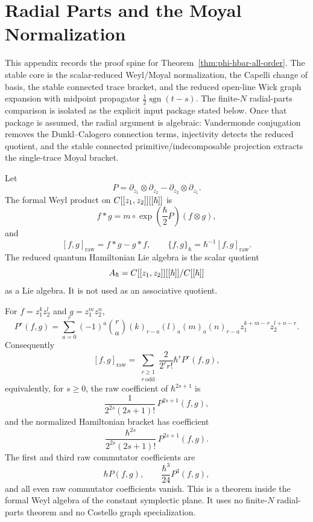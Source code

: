 \section{Radial Parts and the Moyal Normalization}
\label{sec:app-radial-parts-moyal}

This appendix records the proof spine for
Theorem~\ref{thm:phi-hbar-all-order}.  The stable core is the
scalar-reduced Weyl/Moyal normalization, the Capelli change of basis,
the stable connected trace bracket, and the reduced open-line Wick
graph expansion with midpoint propagator
\(\frac12\operatorname{sgn}(t-s)\).  The finite-\(N\) radial-parts
comparison is isolated as the explicit input package stated below.
Once that package is assumed, the radial argument is algebraic:
Vandermonde conjugation removes the Dunkl--Calogero connection terms,
injectivity detects the reduced quotient, and the stable connected
primitive/indecomposable projection extracts the single-trace Moyal
bracket.

\begin{defn}
\label{def:app-radial-moyal-convention}
  Let
  \[
    P=\partial_{z_1}\otimes\partial_{z_2}
      -\partial_{z_2}\otimes\partial_{z_1}.
  \]
  The formal Weyl product on \(C[[z_1,z_2]][[\hbar]]\) is
  \[
    f*g=m\circ\exp\left(\frac{\hbar}{2}P\right)(f\otimes g),
  \]
  and
  \[
    [f,g]_{\mathrm{raw}}=f*g-g*f,\qquad
    \{f,g\}_\hbar=\hbar^{-1}[f,g]_{\mathrm{raw}}.
  \]
  The reduced quantum Hamiltonian Lie algebra is the scalar quotient
  \[
    A_\hbar=C[[z_1,z_2]][[\hbar]]/C[[\hbar]]
  \]
  as a Lie algebra.  It is not used as an associative quotient.
\end{defn}

\begin{thm}
\label{thm:app-radial-moyal-coefficients}
  For \(f=z_1^kz_2^l\) and \(g=z_1^mz_2^n\),
  \[
    P^r(f,g)=
    \sum_{a=0}^r(-1)^a\binom ra
      (k)_{r-a}(l)_a(m)_a(n)_{r-a}
      z_1^{k+m-r}z_2^{l+n-r}.
  \]
  Consequently
  \[
    [f,g]_{\mathrm{raw}}
      =\sum_{\substack{r\geq1\\r\ \mathrm{odd}}}
        \frac{2}{2^r r!}\hbar^rP^r(f,g),
  \]
  equivalently, for \(s\geq0\), the raw coefficient of
  \(\hbar^{2s+1}\) is
  \[
    \frac{1}{2^{2s}(2s+1)!}\,P^{2s+1}(f,g),
  \]
  and the normalized Hamiltonian bracket has coefficient
  \[
    \frac{\hbar^{2s}}{2^{2s}(2s+1)!}\,P^{2s+1}(f,g).
  \]
  The first and third raw commutator coefficients are
  \[
    \hbar P(f,g),\qquad \frac{\hbar^3}{24}P^3(f,g),
  \]
  and all even raw commutator coefficients vanish.  This is a theorem
  inside the formal Weyl algebra of the constant symplectic plane.  It
  uses no finite-\(N\) radial-parts theorem and no Costello graph
  specialization.
\end{thm}

